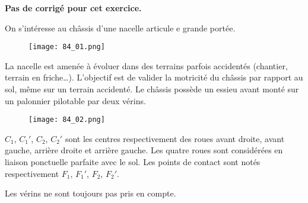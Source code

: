 \normaltrue \difficilefalse \tdifficilefalse
\correctionfalse

\setcounter{question}{0}


\ifcorrection
\else
\textbf{Pas de corrigé pour cet exercice.}
\fi


\ifprof
\else
On s'intéresse au châssis d'une nacelle articule e grande portée.

\begin{figure}[H]
\centering
\texttt{[image: 84\_01.png]}
\end{figure} 

La nacelle est amenée à évoluer dans des terrains parfois accidentés (chantier, terrain en friche…).
L’objectif est de valider la motricité du châssis par rapport au sol, même sur un terrain accidenté. 
Le châssis possède un essieu avant monté sur un palonnier pilotable par deux vérins.


\begin{figure}[H]
\centering
\texttt{[image: 84\_02.png]}
\end{figure} 


$C_1$, $C_1'$, $C_2$, $C_2'$ sont les centres respectivement des roues avant droite, avant gauche, arrière droite 
et arrière gauche. Les quatre roues sont considérées en liaison ponctuelle parfaite avec le sol. Les 
points de contact sont notés respectivement $F_1$, $F_1'$, $F_2$, $F_2'$.





Les vérins ne sont toujours pas pris en compte. 

